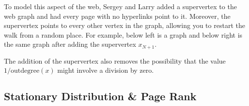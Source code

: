 To model this aspect of the web, Sergey and Larry added a supervertex to the
web graph and had every page with no hyperlinks point to it.  Moreover,
the supervertex points to every other vertex in the graph, allowing you to
restart the walk from a random place.  For example, below left is a graph
and below right is the same graph after adding the supervertex $x_{N+1}$.

\bigskip\centerline{
  \hspace{2cm}
}\bigskip

The addition of the supervertex also removes the possibility that the value
$1/\text{outdegree}(x)$ might involve a division by zero.

\subsection{Stationary Distribution \& Page Rank}

